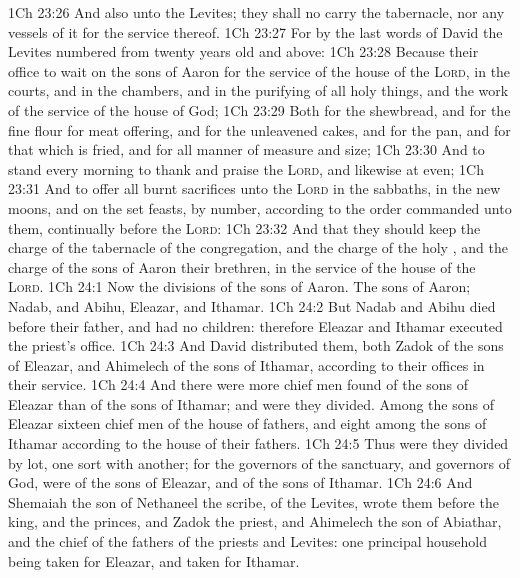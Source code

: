 \vs 1Ch 23:26 And also unto the Levites; they shall no  carry the tabernacle, nor any vessels of it for the service thereof.
\vs 1Ch 23:27 For by the last words of David the Levites  numbered from twenty years old and above:
\vs 1Ch 23:28 Because their office  to wait on the sons of Aaron for the service of the house of the \textsc{Lord}, in the courts, and in the chambers, and in the purifying of all holy things, and the work of the service of the house of God;
\vs 1Ch 23:29 Both for the shewbread, and for the fine flour for meat offering, and for the unleavened cakes, and for  the pan, and for that which is fried, and for all manner of measure and size;
\vs 1Ch 23:30 And to stand every morning to thank and praise the \textsc{Lord}, and likewise at even;
\vs 1Ch 23:31 And to offer all burnt sacrifices unto the \textsc{Lord} in the sabbaths, in the new moons, and on the set feasts, by number, according to the order commanded unto them, continually before the \textsc{Lord}:
\vs 1Ch 23:32 And that they should keep the charge of the tabernacle of the congregation, and the charge of the holy , and the charge of the sons of Aaron their brethren, in the service of the house of the \textsc{Lord}.
\vs 1Ch 24:1 Now  the divisions of the sons of Aaron. The sons of Aaron; Nadab, and Abihu, Eleazar, and Ithamar.
\vs 1Ch 24:2 But Nadab and Abihu died before their father, and had no children: therefore Eleazar and Ithamar executed the priest's office.
\vs 1Ch 24:3 And David distributed them, both Zadok of the sons of Eleazar, and Ahimelech of the sons of Ithamar, according to their offices in their service.
\vs 1Ch 24:4 And there were more chief men found of the sons of Eleazar than of the sons of Ithamar; and  were they divided. Among the sons of Eleazar  sixteen chief men of the house of  fathers, and eight among the sons of Ithamar according to the house of their fathers.
\vs 1Ch 24:5 Thus were they divided by lot, one sort with another; for the governors of the sanctuary, and governors  of God, were of the sons of Eleazar, and of the sons of Ithamar.
\vs 1Ch 24:6 And Shemaiah the son of Nethaneel the scribe,  of the Levites, wrote them before the king, and the princes, and Zadok the priest, and Ahimelech the son of Abiathar, and  the chief of the fathers of the priests and Levites: one principal household being taken for Eleazar, and  taken for Ithamar.
